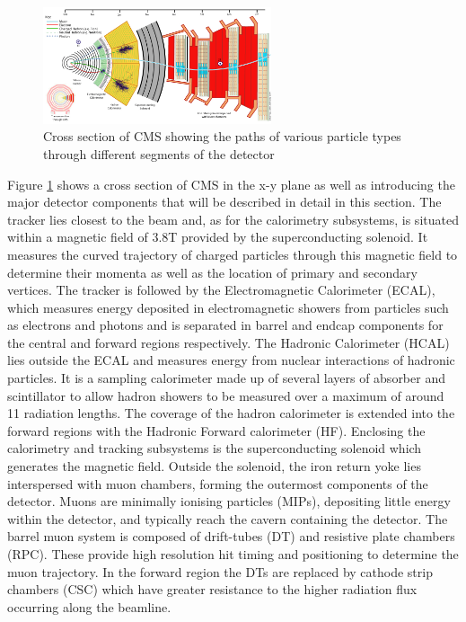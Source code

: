 \begin{figure}
\centering
    \includegraphics[width=0.6\textwidth]{./Figures/detector/CMS_Slice.jpg}
  \caption{Cross section of CMS showing the paths of various particle types 
  through different segments of the detector~\cite{cmsslice}}
  \label{CMS_SLICE}
\end{figure}

Figure \ref{CMS_SLICE} shows a cross section of CMS in the x-y plane as well as introducing the major detector components that will be described 
in detail in this section. The tracker lies closest to the beam and, as for the calorimetry subsystems, is situated within a magnetic field of 3.8T provided
by the superconducting solenoid. It measures the curved trajectory of charged particles through this magnetic field to determine their momenta 
as well as the location of primary and secondary vertices. The tracker is followed by the Electromagnetic Calorimeter (ECAL),
which measures energy deposited in electromagnetic showers from particles such as electrons and photons and is separated in barrel and endcap 
components for the central and forward regions respectively. The Hadronic Calorimeter (HCAL) lies outside the 
ECAL and measures energy from nuclear interactions of hadronic particles. It is a sampling calorimeter
made up of several layers of absorber and scintillator to allow hadron showers to be measured over a maximum of around 11 radiation lengths. 
The coverage of the hadron calorimeter is extended into the forward regions with the Hadronic Forward calorimeter (HF). Enclosing the calorimetry and tracking subsystems 
is the superconducting solenoid which generates the magnetic field. Outside the solenoid, the iron return yoke lies interspersed with muon chambers, forming the outermost components of the detector. 
Muons are minimally ionising particles (MIPs), depositing little energy within the detector, and typically reach the cavern containing the detector. 
The barrel muon system is composed of drift-tubes (DT) and resistive plate chambers (RPC). These provide
high resolution hit timing and positioning to determine the muon trajectory. In the forward region the DTs are 
replaced by cathode strip chambers (CSC) which have greater resistance to the higher 
radiation flux occurring along the beamline. 

